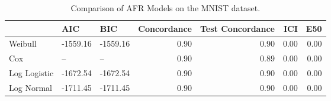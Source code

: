 \begin{table*}
\centering
\caption{Comparison of AFR Models on the MNIST dataset.}
\label{tab:mnist}
\begin{tabular}{lllrrrr}
\toprule
 & AIC & BIC & Concordance & Test Concordance & ICI & E50 \\
\midrule
Weibull & -1559.16 & -1559.16 & 0.90 & 0.90 & 0.00 & 0.00 \\
Cox & -- & -- & 0.90 & 0.89 & 0.00 & 0.00 \\
Log Logistic & -1672.54 & -1672.54 & 0.90 & 0.90 & 0.00 & 0.00 \\
Log Normal & -1711.45 & -1711.45 & 0.90 & 0.90 & 0.00 & 0.00 \\
\bottomrule
\end{tabular}
\end{table*}
